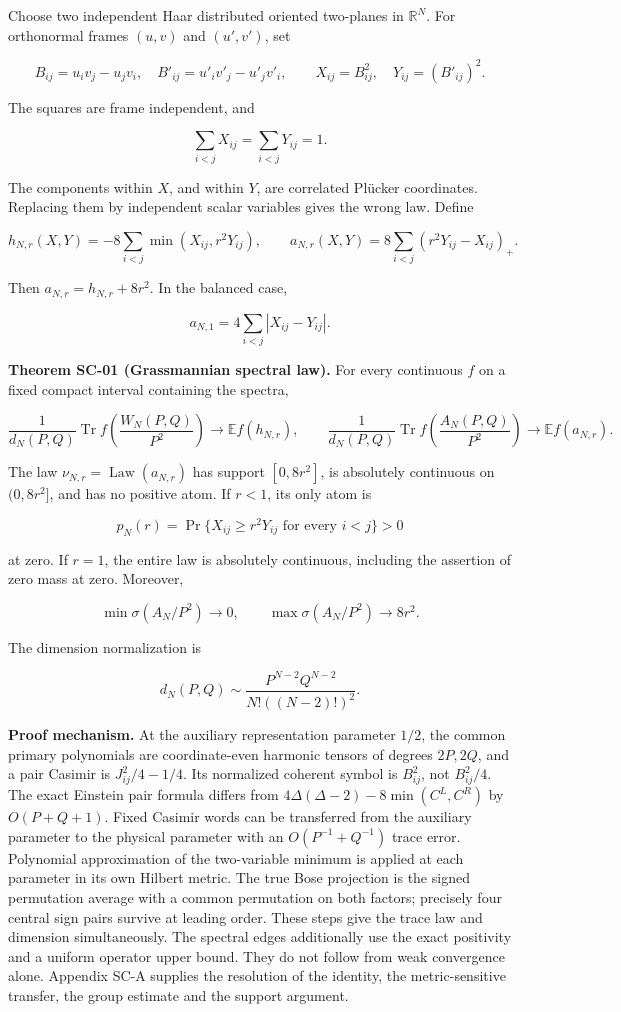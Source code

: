 Choose two independent Haar distributed oriented two-planes in \(\mathbb R^N\). For orthonormal frames \((u,v)\) and \((u',v')\), set

\[
B_{ij}=u_iv_j-u_jv_i,\quad B'_{ij}=u'_iv'_j-u'_jv'_i,
\qquad X_{ij}=B_{ij}^2,\quad Y_{ij}=(B'_{ij})^2.
\]

The squares are frame independent, and

\[
\sum_{i<j}X_{ij}=\sum_{i<j}Y_{ij}=1.
\]

The components within \(X\), and within \(Y\), are correlated Plücker coordinates. Replacing them by independent scalar variables gives the wrong law. Define

\[
h_{N,r}(X,Y)=-8\sum_{i<j}\min(X_{ij},r^2Y_{ij}),\qquad
a_{N,r}(X,Y)=8\sum_{i<j}(r^2Y_{ij}-X_{ij})_+.
\]

Then \(a_{N,r}=h_{N,r}+8r^2\). In the balanced case,

\[
a_{N,1}=4\sum_{i<j}|X_{ij}-Y_{ij}|.
\]

\textbf{Theorem SC-01 (Grassmannian spectral law).} For every continuous \(f\) on a fixed compact interval containing the spectra,

\[
\frac{1}{d_N(P,Q)}\operatorname{Tr}f\!\left(\frac{W_N(P,Q)}{P^2}\right)
\longrightarrow \mathbb E f(h_{N,r}),
\qquad
\frac{1}{d_N(P,Q)}\operatorname{Tr}f\!\left(\frac{A_N(P,Q)}{P^2}\right)
\longrightarrow \mathbb E f(a_{N,r}).
\]

The law \(\nu_{N,r}=\operatorname{Law}(a_{N,r})\) has support \([0,8r^2]\), is absolutely continuous on \((0,8r^2]\), and has no positive atom. If \(r<1\), its only atom is

\[
p_N(r)=\Pr\{X_{ij}\geq r^2Y_{ij}\text{ for every }i<j\}>0
\]

at zero. If \(r=1\), the entire law is absolutely continuous, including the assertion of zero mass at zero. Moreover,

\[
\min\sigma(A_N/P^2)\longrightarrow0,\qquad
\max\sigma(A_N/P^2)\longrightarrow8r^2.
\]

The dimension normalization is

\[
d_N(P,Q)\sim\frac{P^{N-2}Q^{N-2}}{N!((N-2)!)^2}.
\]

\textbf{Proof mechanism.} At the auxiliary representation parameter \(1/2\), the common primary polynomials are coordinate-even harmonic tensors of degrees \(2P,2Q\), and a pair Casimir is \(J_{ij}^2/4-1/4\). Its normalized coherent symbol is \(B_{ij}^2\), not \(B_{ij}^2/4\). The exact Einstein pair formula differs from \(4\Delta(\Delta-2)-8\min(C^L,C^R)\) by \(O(P+Q+1)\). Fixed Casimir words can be transferred from the auxiliary parameter to the physical parameter with an \(O(P^{-1}+Q^{-1})\) trace error. Polynomial approximation of the two-variable minimum is applied at each parameter in its own Hilbert metric. The true Bose projection is the signed permutation average with a common permutation on both factors; precisely four central sign pairs survive at leading order. These steps give the trace law and dimension simultaneously. The spectral edges additionally use the exact positivity and a uniform operator upper bound. They do not follow from weak convergence alone. Appendix SC-A supplies the resolution of the identity, the metric-sensitive transfer, the group estimate and the support argument.

